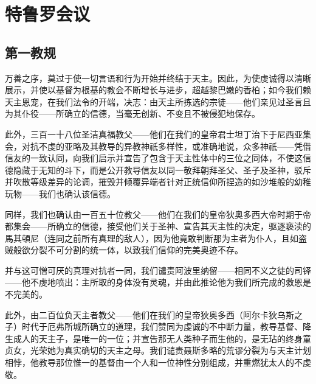 
\chapter{特鲁罗会议}



\section{第一教规}

万善之序，莫过于使一切言语和行为开始并终结于天主。因此，为使虔诚得以清晰展示，并使以基督为根基的教会不断增长与进步，超越黎巴嫩的香柏；如今我们赖天主恩宠，在我们法令的开端，决志：由天主所拣选的宗徒——他们亲见过圣言且为其仆役——所确立的信德，当毫无创新、不变且不被侵犯地保存。\par

此外，三百一十八位圣洁真福教父——他们在我们的皇帝君士坦丁治下于尼西亚集会，对抗不虔的亚略及其教导的异教神祇多样性，或准确地说，众多神祇——凭借信友的一致认同，向我们启示并宣告了包含于天主性体中的三位之同体，不使这信德隐藏于无知的斗下，而是公开教导信友以同一敬拜朝拜圣父、圣子及圣神，驳斥并吹散等级差异的论调，摧毁并倾覆异端者针对正统信仰所捏造的如沙堆般的幼稚玩物——我们也确认该信德。\par

同样，我们也确认由一百五十位教父——他们在我们的皇帝狄奥多西大帝时期于帝都集会——所确立的信德，接受他们关于圣神、宣告其天主性的决定，驱逐亵渎的馬其頓尼（连同之前所有真理的敌人），因为他竟敢判断那为主者为仆人，且如盗贼般欲分裂不可分割的统一体，以致我们信仰的完美奥迹不存。\par

并与这可憎可厌的真理对抗者一同，我们谴责阿波里纳留——相同不义之徒的司铎——他不虔地喷出：主所取的身体没有灵魂，并由此推论他为我们所完成的救恩是不完美的。\par

此外，由二百位负天主者教父——他们在我们的皇帝狄奥多西（阿尔卡狄乌斯之子）时代于厄弗所城所确立的道理，我们赞同为虔诚的不中断力量，教导基督、降生成人的天主子，是唯一的一位；并宣告那无人类种子而生他的，是无玷的终身童贞女，光荣她为真实确切的天主之母。我们谴责聂斯多略的荒谬分裂为与天主计划相悖，他教导那位惟一的基督由一个人和一位神性分别组成，并重燃犹太人的不虔敬。\par

